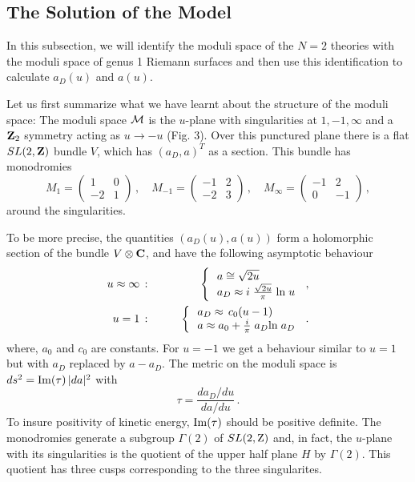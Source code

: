 \subsection{The Solution of the Model}

In this subsection, we will identify the moduli space of the $N=2$
theories with the moduli space of genus 1 Riemann surfaces and then
use this identification to calculate $a_D(u)$ and $a(u)$. 

Let us first summarize what we have learnt about the structure of the
moduli space: The moduli space ${\cal M}$ is the $u$-plane with
singularities at $1, -1, \infty$ and a ${\bf Z}_{2}$ symmetry acting
as $u \rightarrow -u$ (Fig. 3). Over this punctured plane there is a
flat $SL(2,{\bf Z})$ bundle $V$, which has $(a_D, a)^T$ as a
section. This bundle has monodromies  
\begin{equation}
M_{1} = \left( \begin{array}{cc}
1 & 0 \\ -2 & 1 \end{array} \right )\,, \quad
M_{-1} = \left( \begin{array}{cc}
-1 & 2 \\ -2 & 3 \end{array} \right )\,, \quad
M_{\infty} = \left( \begin{array}{cc}
-1 & 2 \\ 0 & -1 \end{array} \right )\,,
\label{mondall}
\end{equation}
around the singularities. 

To be more precise, the quantities $(a_D(u), a(u))$ form a holomorphic
section of the bundle $V\otimes {\bf C}$, and have the following
asymptotic behaviour
\begin{eqnarray}
u\approx \infty\,:&\qquad& \left\{\, \begin{array}{l}
a \cong \sqrt{2u}\,  \\
a_D \approx i\;\frac{\sqrt{2u}}{\pi}\;{\rm ln}\; u
\end{array} \right. \,, \nonumber\\
u=1\,:&\qquad& \left\{\, \begin{array}{l}
a_D \approx \,c_0 (u-1) \\
a \approx a_0 + \frac{i}{\pi} \; a_{D}{\rm ln}\; a_{D}
\end{array} \right. \,.\nonumber
\end{eqnarray}
where, $a_0$ and $c_0$ are constants. For $u=-1$ we get a behaviour
similar to $u=1$ but with $a_D$ replaced by $a-a_D$. The metric on the
moduli space is $ds^2={\rm Im}(\tau)\,|da|^2$ with 
\begin{equation}
\tau =\frac{da_D/du}{da / du}\,.
\label{tau-metric}
\end{equation}
To insure positivity of kinetic energy, ${\rm Im}(\tau)$ should be
positive definite. The monodromies generate a subgroup $\Gamma(2)$ of
$SL(2,{\rm Z})$ and, in fact, the $u$-plane with its singularities is
the quotient of the upper half plane $H$ by $\Gamma(2)$. This quotient
has three cusps corresponding to the three singularites.

